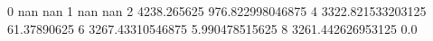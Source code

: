 0 nan nan
1 nan nan
2 4238.265625 976.822998046875
4 3322.821533203125 61.37890625
6 3267.43310546875 5.990478515625
8 3261.442626953125 0.0
